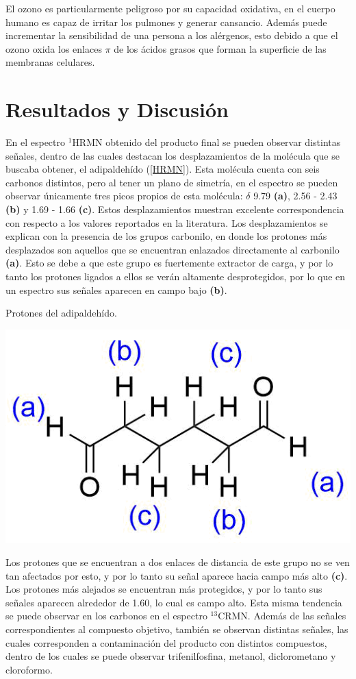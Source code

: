 \documentclass[fleqn,10pt]{SelfArx}
\begin{document}
El ozono es particularmente peligroso por su capacidad oxidativa, en el cuerpo humano es capaz de irritar los pulmones y generar cansancio. Adem\'as puede incrementar la sensibilidad de una persona a los al\'ergenos, esto debido a que el ozono oxida los enlaces $\pi$ de los \'acidos grasos que forman la superficie de las membranas celulares\cite{Wade2013}.
\newpage
\section{Resultados y Discusi\'on}
En el espectro $^1$HRMN obtenido del producto final se pueden observar distintas señales, dentro de las cuales destacan los desplazamientos de la molécula que se buscaba obtener, el adipaldehído (\autoref{HRMN}). Esta molécula cuenta con seis carbonos distintos, pero al tener un plano de simetría, en el espectro se pueden observar únicamente tres picos propios de esta molécula: $\delta$ 9.79 \textbf{(a)}, 2.56 - 2.43 \textbf{(b)} y 1.69 - 1.66 \textbf{(c)}. Estos desplazamientos muestran excelente correspondencia con respecto a los valores reportados en la literatura\cite{Miller2017}. Los desplazamientos se explican con la presencia de los grupos carbonilo, en donde los protones más desplazados son aquellos que se encuentran enlazados directamente al carbonilo \textbf{(a)}. Esto se debe a que este grupo es fuertemente extractor de carga, y por lo tanto los protones ligados a ellos se verán altamente desprotegidos, por lo que en un espectro sus señales aparecen en campo bajo \textbf{(b)}. 
\begin{scheme}[h]
	\centering
	\caption{Protones del adipaldeh\'ido.}
	\includegraphics[width=0.5\linewidth]{structures/hidrogenos.png}
\end{scheme}

Los protones que se encuentran a dos enlaces de distancia de este grupo no se ven tan afectados por esto, y por lo tanto su señal aparece hacia campo más alto \textbf{(c)}. Los protones más alejados se encuentran más protegidos, y por lo tanto sus señales aparecen alrededor de 1.60, lo cual es campo alto. Esta misma tendencia se puede observar en los carbonos en el espectro $^{13}$CRMN. Además de las señales correspondientes al compuesto objetivo, también se observan distintas señales, las cuales corresponden a contaminación del producto con distintos compuestos, dentro de los cuales se puede observar trifenilfosfina, metanol, diclorometano y cloroformo.
\end{document}
